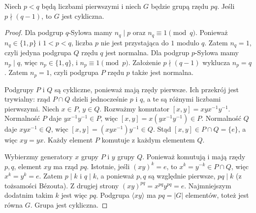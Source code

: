 \begin{twierdzenie}
\label{aa:tw:pq-cykliczna}
Niech $p<q$ będą liczbami pierwszymi i niech $G$ będzie grupą
rzędu $pq$. Jeśli $p\nmid(q-1)$, to $G$ jest cykliczna.
\end{twierdzenie}
\begin{proof}
Dla podgrup $q$-Sylowa mamy $n_q\mid p$ oraz
$n_q\equiv1\pmod q$. Ponieważ $n_q\in\{1,p\}$
i $1<p<q$, liczba $p$ nie jest przystająca do $1$ modulo $q$.
Zatem $n_q=1$, czyli jedyna podgrupa $Q$ rzędu $q$ jest normalna.
Dla podgrup $p$-Sylowa mamy $n_p\mid q$,
więc $n_p\in\{1,q\}$, i $n_p\equiv1\pmod p$.
Założenie $p\nmid(q-1)$ wyklucza $n_p=q$.
Zatem $n_p=1$, czyli podgrupa $P$ rzędu $p$ także jest normalna.

Podgrupy $P$ i $Q$ są cykliczne, ponieważ mają rzędy pierwsze.
Ich przekrój jest trywialny: rząd $P\cap Q$ dzieli jednocześnie
$p$ i $q$, a te są różnymi liczbami pierwszymi.
Niech $x\in P$, $y\in Q$. Rozważmy komutator
$[x,y]=xyx^{-1}y^{-1}$.
Normalność $P$ daje $yx^{-1}y^{-1}\in P$,
więc $[x,y]=x(yx^{-1}y^{-1})\in P$.
Normalność $Q$ daje $xyx^{-1}\in Q$,
więc $[x,y]=(xyx^{-1})y^{-1}\in Q$.
Stąd $[x,y]\in P\cap Q=\{e\}$, a więc $xy=yx$.
Każdy element $P$ komutuje z każdym elementem $Q$.

Wybierzmy generatory $x$ grupy $P$ i $y$ grupy $Q$.
Ponieważ komutują i mają rzędy $p,q$, element $xy$ ma
rząd $pq$. Istotnie, jeśli $(xy)^k=e$, to
$x^k=y^{-k}\in P\cap Q$, więc $x^k=y^k=e$.
Zatem $p\mid k$ i $q\mid k$, a ponieważ $p,q$ są względnie
pierwsze, $pq\mid k$ (z tożsamości Bézouta).
Z drugiej strony $(xy)^{pq}=x^{pq}y^{pq}=e$.
Najmniejszym dodatnim takim $k$ jest więc $pq$.
Podgrupa $\langle xy\rangle$ ma $pq=|G|$ elementów,
toteż jest równa $G$. Grupa jest cykliczna.
\end{proof}

